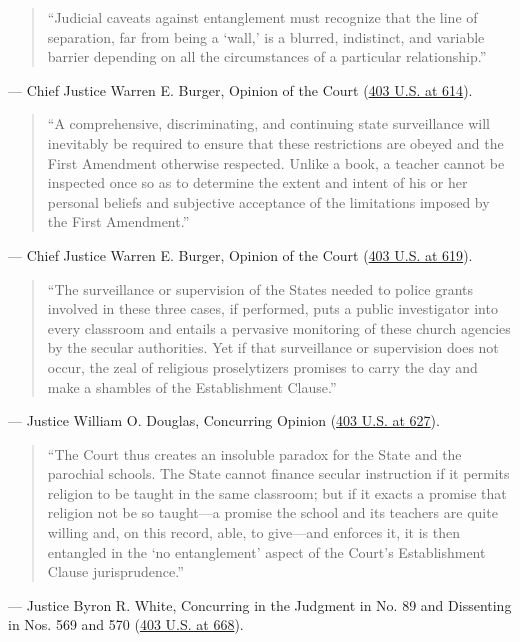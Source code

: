 \documentclass[12pt]{article}
\begin{document}
\begin{quote}
``Judicial caveats against entanglement must recognize that the line of separation, far from being a `wall,' is a blurred, indistinct, and variable barrier depending on all the circumstances of a particular relationship.''
\end{quote}
\noindent --- Chief Justice Warren E. Burger, Opinion of the Court (\href{https://supreme.justia.com/cases/federal/us/403/602/}{403 U.S. at 614}).

\begin{quote}
``A comprehensive, discriminating, and continuing state surveillance will inevitably be required to ensure that these restrictions are obeyed and the First Amendment otherwise respected. Unlike a book, a teacher cannot be inspected once so as to determine the extent and intent of his or her personal beliefs and subjective acceptance of the limitations imposed by the First Amendment.''
\end{quote}
\noindent --- Chief Justice Warren E. Burger, Opinion of the Court (\href{https://supreme.justia.com/cases/federal/us/403/602/}{403 U.S. at 619}).

\begin{quote}
``The surveillance or supervision of the States needed to police grants involved in these three cases, if performed, puts a public investigator into every classroom and entails a pervasive monitoring of these church agencies by the secular authorities. Yet if that surveillance or supervision does not occur, the zeal of religious proselytizers promises to carry the day and make a shambles of the Establishment Clause.''
\end{quote}
\noindent --- Justice William O. Douglas, Concurring Opinion (\href{https://supreme.justia.com/cases/federal/us/403/602/}{403 U.S. at 627}).

\begin{quote}
``The Court thus creates an insoluble paradox for the State and the parochial schools. The State cannot finance secular instruction if it permits religion to be taught in the same classroom; but if it exacts a promise that religion not be so taught---a promise the school and its teachers are quite willing and, on this record, able, to give---and enforces it, it is then entangled in the `no entanglement' aspect of the Court's Establishment Clause jurisprudence.''
\end{quote}
\noindent --- Justice Byron R. White, Concurring in the Judgment in No. 89 and Dissenting in Nos. 569 and 570 (\href{https://supreme.justia.com/cases/federal/us/403/602/}{403 U.S. at 668}).
\end{document}
